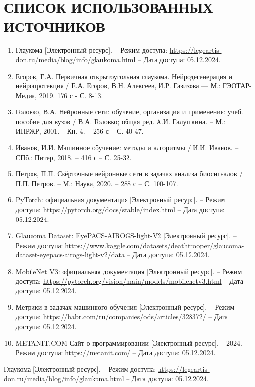 {    \section*{СПИСОК ИСПОЛЬЗОВАННЫХ ИСТОЧНИКОВ}
    \begin{enumerate}
        \item Глаукома [Электронный ресурс]. – Режим доступа: \url{https://legeartis-don.ru/media/blog/info/glaukoma.html} – Дата доступа: 05.12.2024.
        \item Егоров, Е.А. Первичная открытоугольная глаукома. Нейродегенерация и нейропротекция / Е.А. Егоров, В.Н. Алексеев, И.Р. Газизова — М.: ГЭОТАР-Медиа, 2019. 176 с - С. 8-13.
        \item Головко, В.А. Нейронные сети: обучение, организация и применение: учеб. пособие для вузов / В.А. Головко; общая ред. А.И. Галушкина. – М.: ИПРЖР, 2001. – Кн. 4. – 256 с – С. 40-47.
        \item Иванов, И.И. Машинное обучение: методы и алгоритмы / И.И. Иванов. – СПб.: Питер, 2018. – 416 с – С. 25-32.
        \item Петров, П.П. Свёрточные нейронные сети в задачах анализа биосигналов / П.П. Петров. – М.: Наука, 2020. – 288 с – С. 100-107.
        \item PyTorch: официальная документация [Электронный ресурс]. – Режим доступа: \url{https://pytorch.org/docs/stable/index.html} – Дата доступа: 05.12.2024.
        \item Glaucoma Dataset: EyePACS-AIROGS-light-V2 [Электронный ресурс]. – Режим доступа: \url{https://www.kaggle.com/datasets/deathtrooper/glaucoma-dataset-eyepacs-airogs-light-v2/data} – Дата доступа: 05.12.2024.
        \item MobileNet V3: официальная документация [Электронный ресурс]. – Режим доступа: \url{https://pytorch.org/vision/main/models/mobilenetv3.html} – Дата доступа: 05.12.2024.
        \item Метрики в задачах машинного обучения [Электронный ресурс]. – Режим доступа: \url{https://habr.com/ru/companies/ods/articles/328372/} – Дата доступа: 05.12.2024.
        \item METANIT.COM Сайт о программировании [Электронный ресурс]. – 2024. – Режим доступа: \url{https://metanit.com/} – Дата доступа: 05.12.2024.

    \end{enumerate}
    
    
    \clearpage
    
\begin{thebibliography}{99}
    \vspace{13pt}
    Глаукома [Электронный ресурс]. – Режим доступа: \url{https://legeartis-don.ru/media/blog/info/glaukoma.html} – Дата доступа: 05.12.2024.


\end{thebibliography}}
